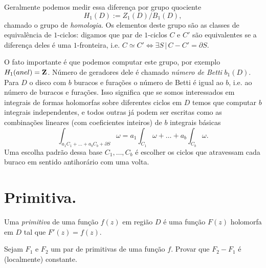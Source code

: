 Geralmente podemos medir essa diferença por grupo quociente
\[ H_1(D) := Z_1(D) / B_1(D), \] 
chamado o grupo de \emph{homologia}.
Os elementos deste grupo são as classes de equivalência de $1$-ciclos:
digamos que par de $1$-ciclos $C$ e $C'$ são equivalentes se a diferença deles é uma $1$-fronteira,
i.e. $C \simeq C' \iff \exists S \,|\, C-C' = \partial S$.

O fato importante é que podemos computar este grupo, por exemplo $H_1(anel) = \mathbf{Z}$.
Número de geradores dele é chamado \emph{número de Betti} $b_1(D)$.
Para $D$ o disco com $b$ buracos e furações o número de Betti é igual ao $b$,
i.e. ao número de buracos e furações. Isso significa que se somos interessados em integrais de formas holomorfas sobre
diferentes ciclos em $D$ temos que computar $b$ integrais independentes, e todos outras
já podem ser escritas como as combinações lineares (com coeficientes inteiros) de $b$ integrais básicas
\[ \int_{a_1 C_1 + \dots + a_b C_b + \partial S} \omega = a_1 \int_{C_1} \omega + \dots + a_b \int_{C_b} \omega. \]
Uma escolha padrão dessa base $C_1,\dots,C_b$ é escolher os ciclos que atravessam cada buraco em sentido antihorário com uma volta.

\section{Primitiva.}

\begin{defin}
Uma \emph{primitiva} de uma função $f(z)$ em região $D$
é uma função $F(z)$ holomorfa em $D$ tal que $F'(z) = f(z)$.
\end{defin}

\begin{problema}
Sejam $F_1$ e $F_2$ um par de primitivas de uma função $f$.
Provar que $F_2 - F_1$ é (localmente) constante.
\end{problema}

